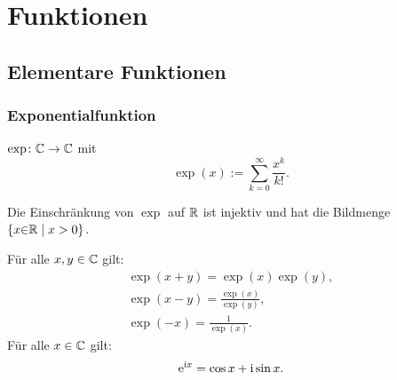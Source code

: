 
\chapter{Funktionen}
\section{Elementare Funktionen}
\subsection{Exponentialfunktion}
\begin{Definition}
$\exp\colon\mathbb C\to\mathbb C$ mit
\begin{equation}
\exp(x) := \sum_{k=0}^{\infty} \frac{x^k}{k!}.
\end{equation}
\end{Definition}
\noindent
Die Einschränkung von $\exp$ auf $\mathbb R$ ist injektiv und
hat die Bildmenge $\{x{\in}\mathbb R\mid x>0\}$.

Für alle $x,y\in\mathbb C$ gilt:
\begin{gather}
\exp(x+y) = \exp(x)\exp(y),\\
\exp(x-y) = \frac{\exp(x)}{\exp(y)},\\
\exp(-x) = \frac{1}{\exp(x)}.
\end{gather}
 Für alle $x\in\mathbb C$ gilt:
\begin{equation}
\mathrm e^{\mathrm i x} = \cos x+\mathrm i\sin x.
\end{equation}

